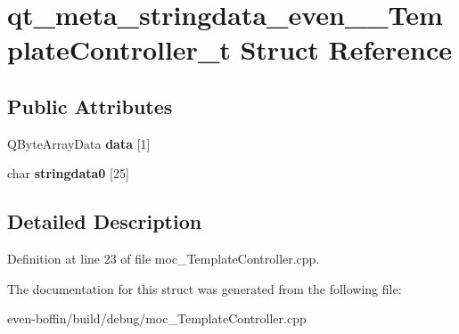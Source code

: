 \hypertarget{structqt__meta__stringdata__even_____template_controller__t}{}\section{qt\+\_\+meta\+\_\+stringdata\+\_\+even\+\_\+\+\_\+\+Template\+Controller\+\_\+t Struct Reference}
\label{structqt__meta__stringdata__even_____template_controller__t}
\subsection*{Public Attributes}
\begin{DoxyCompactItemize}
\item 
\mbox{\label{structqt__meta__stringdata__even_____template_controller__t_a548e30ee95a1ac1450a3f28ff4b02f08}} 
Q\+Byte\+Array\+Data {\bfseries data} \mbox{[}1\mbox{]}
\item 
\mbox{\label{structqt__meta__stringdata__even_____template_controller__t_a7087a768e6154786f4941b139ac3ae16}} 
char {\bfseries stringdata0} \mbox{[}25\mbox{]}
\end{DoxyCompactItemize}


\subsection{Detailed Description}


Definition at line 23 of file moc\+\_\+\+Template\+Controller.\+cpp.



The documentation for this struct was generated from the following file\+:\begin{DoxyCompactItemize}
\item 
even-\/boffin/build/debug/moc\+\_\+\+Template\+Controller.\+cpp\end{DoxyCompactItemize}
